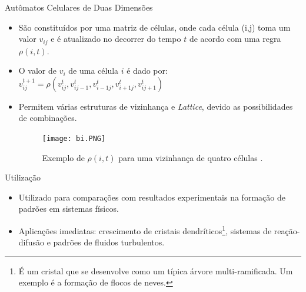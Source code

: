 \documentclass[compress, hide notes]{beamer}
\begin{document}
\begin{frame}[allowframebreaks]{Autômatos Celulares de Duas Dimensões \cite{pt}}
	
	\begin{itemize}
	
		\item São constituídos por uma matriz de células, onde cada célula (i,j) toma um valor $v_{ij}$ e é atualizado no decorrer do tempo $t$ de acordo com uma regra $\rho(i,t)$.
		
		\bigskip
		
		\item O valor de $v_i$ de uma célula $i$ é dado por: $v_{ij}^{t+1}=\rho(v_{ij}^t, v_{ij-1}^t, v_{i-1j}^t, v_{i+1j}^t, v_{ij+1}^t)$
        
        \bigskip
        
        \item Permitem várias estruturas de vizinhança e \textit{Lattice}, devido as possibilidades de combinações.
        
        \bigskip
        
        \framebreak
			
		\begin{figure}[h]
								
			\center
													
			\texttt{[image: bi.PNG]}
			\caption{Exemplo de $\rho(i,t)$ para uma vizinhança de quatro células \cite{pt}.}
							
		\end{figure}
		
	\end{itemize}
	
\end{frame}	

\begin{frame}{Utilização \cite{ufmg}}
	
	\begin{itemize}
	
		\item Utilizado para comparações com resultados experimentais na formação de padrões em sistemas físicos.
		
		\bigskip
		
		\item Aplicações imediatas: crescimento de cristais dendríticos\footnote{É um cristal que se desenvolve como um típica árvore multi-ramificada. Um exemplo é a formação de flocos de neves.}, sistemas de reação-difusão e padrões de fluidos turbulentos.
		
	\end{itemize}
	
\end{frame}
\end{document}

